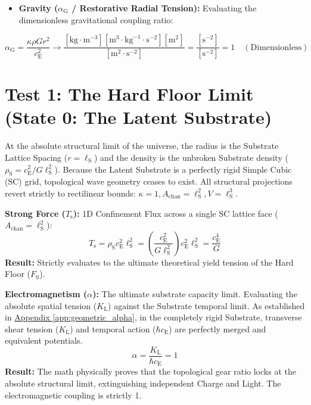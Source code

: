 \begin{itemize}
    \item \textbf{Gravity ($\alpha_{\mathrm{G}}$ / Restorative Radial Tension):} Evaluating the dimensionless gravitational coupling ratio:
\end{itemize}
\begin{equation}
    \alpha_{\mathrm{G}} = \frac{\kappa \rho G r^2}{c_{\mathrm{E}}^2} \to \frac{[\text{kg} \cdot \text{m}^{-3}][\text{m}^3 \cdot \text{kg}^{-1} \cdot \text{s}^{-2}][\text{m}^2]}{[\text{m}^2 \cdot \text{s}^{-2}]} = \frac{[\text{s}^{-2}]}{[\text{s}^{-2}]} = 1 \quad (\text{Dimensionless})
\end{equation}

\section{Test 1: The Hard Floor Limit (State 0: The Latent Substrate)}
At the absolute structural limit of the universe, the radius is the Substrate Lattice Spacing ($r = \ell_{\mathrm{S}}$) and the density is the unbroken Substrate density ($\rho_{\mathrm{S}} = c_{\mathrm{E}}^2 / G\ell_{\mathrm{S}}^2$). Because the Latent Substrate is a perfectly rigid Simple Cubic (SC) grid, topological wave geometry ceases to exist. All structural projections revert strictly to rectilinear bounds: $\kappa = 1, A_{\mathrm{chan}} = \ell_{\mathrm{S}}^2, V = \ell_{\mathrm{S}}^3$.

\vspace{0.2em}
\noindent \textbf{Strong Force ($T_{\mathrm{s}}$):} 1D Confinement Flux across a single SC lattice face ($A_{\mathrm{chan}} = \ell_{\mathrm{S}}^2$):
\begin{equation}
    T_{\mathrm{s}} = \rho_{\mathrm{S}} c_{\mathrm{E}}^2 \ell_{\mathrm{S}}^2 = \left(\frac{c_{\mathrm{E}}^2}{G\ell_{\mathrm{S}}^2}\right) c_{\mathrm{E}}^2 \ell_{\mathrm{S}}^2 = \frac{c_{\mathrm{E}}^4}{G}
\end{equation}
\noindent \textbf{Result:} Strictly evaluates to the ultimate theoretical yield tension of the Hard Floor ($F_{\mathrm{S}}$).

\vspace{0.2em}
\noindent \textbf{Electromagnetism ($\alpha$):} The ultimate substrate capacity limit. Evaluating the absolute spatial tension ($K_{\mathrm{L}}$) against the Substrate temporal limit. As established in \hyperref[app:geometric_alpha]{Appendix \ref*{app:geometric_alpha}}, in the completely rigid Substrate, transverse shear tension ($K_{\mathrm{L}}$) and temporal action ($\hbar c_{\mathrm{E}}$) are perfectly merged and equivalent potentials.
\begin{equation}
    \alpha = \frac{K_{\mathrm{L}}}{\hbar c_{\mathrm{E}}} = 1
\end{equation}
\noindent \textbf{Result:} The math physically proves that the topological gear ratio locks at the absolute structural limit, extinguishing independent Charge and Light. The electromagnetic coupling is strictly 1.

